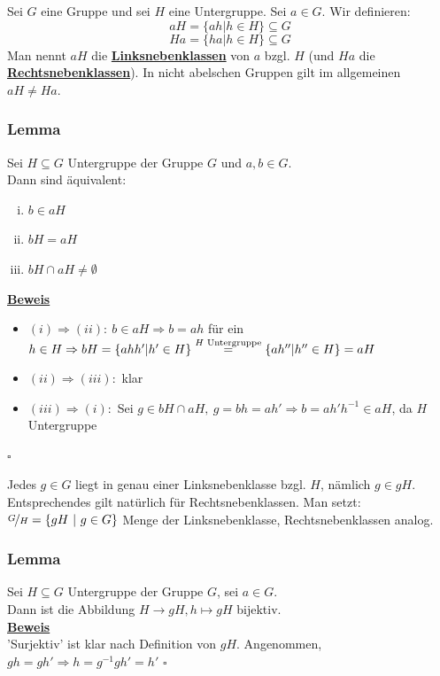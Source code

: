 \documentclass[a4paper, pagesize=pdftex, pdftex, twoside, headsepline, index=totoc,toc=listof, fontsize=10pt, cleardoublepage=empty, headinclude, DIV=13, BCOR=13mm]{scrartcl}
\newcommand{\bet}[1]{\uline{\textbf{#1}}} %
\begin{document}
Sei $G$ eine Gruppe und sei $H$ eine Untergruppe. Sei $a\in G$. Wir definieren:
\[aH=\{ah | h\in H\}\subseteq G\]
\[Ha=\{ha | h\in H\}\subseteq G\]
Man nennt $aH$ die \bet{Linksnebenklassen} von $a$ bzgl. $H$ (und $Ha$ die \bet{Rechtsnebenklassen}). In nicht abelschen Gruppen gilt im allgemeinen $aH\not=Ha$.

\subsubsection*{Lemma}
Sei $H\subseteq G$ Untergruppe der Gruppe $G$ und $a,b\in G$.\\
Dann sind äquivalent:
\begin{enumerate}[(i)]
	\item $b\in aH$
	\item $bH=aH$
	\item $bH \cap aH \not= \emptyset$
\end{enumerate}
\bet{Beweis}\\
\begin{itemize}
	\item$(i)\Rightarrow (ii):~b\in aH \Rightarrow b=ah$ für ein $h\in H \Rightarrow bH=\{ahh' | h' \in H\}\\
	\stackrel{H\text{ Untergruppe}}{=}\{ah'' | h''\in H\}=aH$
	\item$(ii) \Rightarrow (iii):$ klar
	\item$(iii) \Rightarrow (i):$ Sei $g \in bH \cap aH,~g=bh=ah' \Rightarrow b=ah'h^{-1} \in aH$, da $H$ Untergruppe
\end{itemize}
\hfill $\square$

Jedes $g\in G$ liegt in genau einer Linksnebenklasse bzgl. $H$, nämlich $g \in gH$.
Entsprechendes gilt natürlich für Rechtsnebenklassen. Man setzt:\\
$\nicefrac{G}{H}=\{gH~|~g \in G \}$ Menge der Linksnebenklasse, Rechtsnebenklassen analog.

\subsubsection*{Lemma}
Sei $H\subseteq G$ Untergruppe der Gruppe $G$, sei $a \in G$.\\
Dann ist die Abbildung $H \to gH, h \mapsto gH$ bijektiv.\\
\bet{Beweis}\\
'Surjektiv' ist klar nach Definition von $gH$. Angenommen, $gh=gh' \Rightarrow h=g^{-1}gh'=h'$
\hfill $\square$
\end{document}
